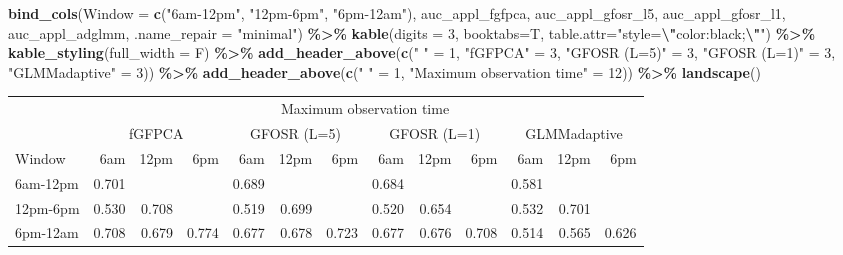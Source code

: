 \documentclass[
]{article}
\newenvironment{Shaded}{\begin{snugshade}}{\end{snugshade}}
\newcommand{\AttributeTok}[1]{\textcolor[rgb]{0.13,0.29,0.53}{#1}}
\newcommand{\DecValTok}[1]{\textcolor[rgb]{0.00,0.00,0.81}{#1}}
\newcommand{\FunctionTok}[1]{\textcolor[rgb]{0.13,0.29,0.53}{\textbf{#1}}}
\newcommand{\NormalTok}[1]{#1}
\newcommand{\OtherTok}[1]{\textcolor[rgb]{0.56,0.35,0.01}{#1}}
\newcommand{\SpecialCharTok}[1]{\textcolor[rgb]{0.81,0.36,0.00}{\textbf{#1}}}
\newcommand{\StringTok}[1]{\textcolor[rgb]{0.31,0.60,0.02}{#1}}
\begin{document}
\begin{Shaded}
\begin{Highlighting}[]
\FunctionTok{bind\_cols}\NormalTok{(}\AttributeTok{Window =} \FunctionTok{c}\NormalTok{(}\StringTok{"6am{-}12pm"}\NormalTok{, }\StringTok{"12pm{-}6pm"}\NormalTok{, }\StringTok{"6pm{-}12am"}\NormalTok{),}
\NormalTok{          auc\_appl\_fgfpca, auc\_appl\_gfosr\_l5, auc\_appl\_gfosr\_l1, auc\_appl\_adglmm,}
          \AttributeTok{.name\_repair =} \StringTok{"minimal"}\NormalTok{) }\SpecialCharTok{\%\textgreater{}\%}
  \FunctionTok{kable}\NormalTok{(}\AttributeTok{digits =} \DecValTok{3}\NormalTok{, }\AttributeTok{booktabs=}\NormalTok{T,}
        \AttributeTok{table.attr=}\StringTok{"style=}\SpecialCharTok{\textbackslash{}"}\StringTok{color:black;}\SpecialCharTok{\textbackslash{}"}\StringTok{"}\NormalTok{) }\SpecialCharTok{\%\textgreater{}\%}
  \FunctionTok{kable\_styling}\NormalTok{(}\AttributeTok{full\_width =}\NormalTok{ F) }\SpecialCharTok{\%\textgreater{}\%} 
  \FunctionTok{add\_header\_above}\NormalTok{(}\FunctionTok{c}\NormalTok{(}\StringTok{" "} \OtherTok{=} \DecValTok{1}\NormalTok{, }\StringTok{"fGFPCA"} \OtherTok{=} \DecValTok{3}\NormalTok{, }\StringTok{"GFOSR (L=5)"} \OtherTok{=} \DecValTok{3}\NormalTok{, }
                     \StringTok{"GFOSR (L=1)"} \OtherTok{=} \DecValTok{3}\NormalTok{, }\StringTok{"GLMMadaptive"} \OtherTok{=} \DecValTok{3}\NormalTok{)) }\SpecialCharTok{\%\textgreater{}\%}
  \FunctionTok{add\_header\_above}\NormalTok{(}\FunctionTok{c}\NormalTok{(}\StringTok{" "} \OtherTok{=} \DecValTok{1}\NormalTok{, }\StringTok{"Maximum observation time"} \OtherTok{=} \DecValTok{12}\NormalTok{)) }\SpecialCharTok{\%\textgreater{}\%}
  \FunctionTok{landscape}\NormalTok{()}
\end{Highlighting}
\end{Shaded}

\begin{landscape}
\begin{longtable}[t]{lrrrrrrrrrrrr}
\toprule
\multicolumn{1}{c}{ } & \multicolumn{12}{c}{Maximum observation time} \\
\cmidrule(l{3pt}r{3pt}){2-13}
\multicolumn{1}{c}{ } & \multicolumn{3}{c}{fGFPCA} & \multicolumn{3}{c}{GFOSR (L=5)} & \multicolumn{3}{c}{GFOSR (L=1)} & \multicolumn{3}{c}{GLMMadaptive} \\
\cmidrule(l{3pt}r{3pt}){2-4} \cmidrule(l{3pt}r{3pt}){5-7} \cmidrule(l{3pt}r{3pt}){8-10} \cmidrule(l{3pt}r{3pt}){11-13}
Window & 6am & 12pm & 6pm & 6am & 12pm & 6pm & 6am & 12pm & 6pm & 6am & 12pm & 6pm\\
\midrule
6am-12pm & 0.701 &  &  & 0.689 &  &  & 0.684 &  &  & 0.581 &  & \\
12pm-6pm & 0.530 & 0.708 &  & 0.519 & 0.699 &  & 0.520 & 0.654 &  & 0.532 & 0.701 & \\
6pm-12am & 0.708 & 0.679 & 0.774 & 0.677 & 0.678 & 0.723 & 0.677 & 0.676 & 0.708 & 0.514 & 0.565 & 0.626\\
\bottomrule
\end{longtable}
\end{landscape}
\end{document}

